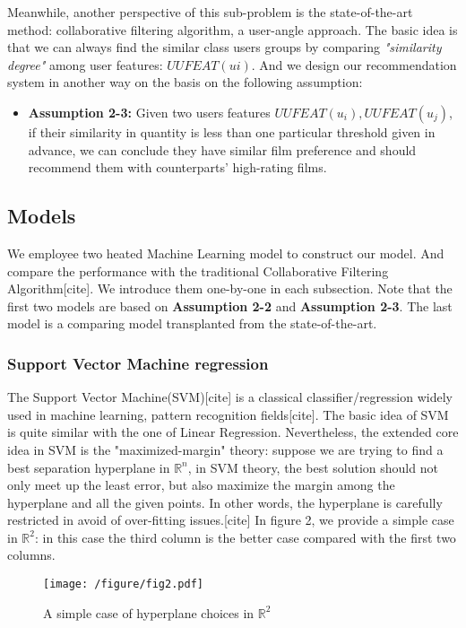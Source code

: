 Meanwhile, another perspective of this sub-problem is the state-of-the-art method: collaborative filtering algorithm, a user-angle approach. The basic idea is that we can always find the similar class users groups by comparing \textit{"similarity degree"} among user features: $UUFEAT(u{i})$. And we design our recommendation system in another way on the basis on the following assumption:
\begin{itemize}
\item \textbf{Assumption 2-3:} Given two users features $UUFEAT(u_{i}), UUFEAT(u_{j})$, if their similarity in quantity is less than one particular threshold given in advance, we can conclude they have similar film preference and should recommend them with counterparts' high-rating films.
\end{itemize}

\subsection{Models}
We employee two heated Machine Learning model to construct our model. And compare the performance with the traditional Collaborative Filtering Algorithm[cite]. We introduce them one-by-one in each subsection. Note that the first two models are based on \textbf{Assumption 2-2} and \textbf{Assumption 2-3}. The last model is a comparing model transplanted from the state-of-the-art.

\subsubsection{Support Vector Machine regression}
The Support Vector Machine(SVM)[cite] is a classical classifier/regression widely used in machine learning, pattern recognition fields[cite]. The basic idea of SVM is quite similar with the one of Linear Regression. Nevertheless, the extended core idea in SVM is the "maximized-margin" theory: suppose we are trying to find a best separation hyperplane in $\mathbb{R}^{n}$, in SVM theory, the best solution should not only meet up the least error, but also maximize the margin among the hyperplane and all the given points. In other words, the hyperplane is carefully restricted in avoid of over-fitting issues.[cite]
In figure 2, we provide a simple case in $\mathbb{R}^{2}$: in this case the third column is the better case compared with the first two columns. 
\begin{figure}[htbp]
\centering
\texttt{[image: /figure/fig2.pdf]}
\caption{A simple case of hyperplane choices in $\mathbb{R}^{2}$} \label{fig:2}
\end{figure}

